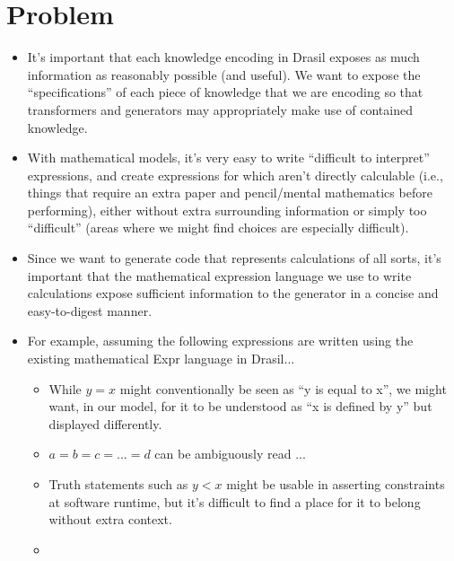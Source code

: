 
\section{Problem}

\begin{itemize}

	\item It's important that each knowledge encoding in Drasil exposes as much
	      information as reasonably possible (and useful).  We want to expose the ``specifications'' of each piece
	      of knowledge that we are encoding so that transformers and generators
	      may appropriately make use of contained knowledge.

	\item With mathematical models, it's very easy to write ``difficult to
	      interpret'' expressions, and create expressions for which aren't
	      directly calculable (i.e., things that require an extra paper and
	      pencil/mental mathematics before performing), either without
	      extra surrounding information or simply too ``difficult'' (areas
	      where we might find choices are especially difficult).

	\item Since we want to generate code that represents calculations of all
	      sorts, it's important that the mathematical expression language we
	      use to write calculations expose sufficient information to the
	      generator in a concise and easy-to-digest manner.

	\item For example, assuming the following expressions are written using
	      the existing mathematical Expr language in Drasil...
	      \begin{itemize}

		      \item While \(y = x\) might conventionally be seen as ``y is
		            equal to x'', we might want, in our model, for it to be
		            understood as ``x is defined by y'' but displayed differently.

		      \item \(a = b = c = ... = d\) can be ambiguously read ...

		      \item Truth statements such as \(y < x\) might be usable in
		            asserting constraints at software runtime, but it's
		            difficult to find a place for it to belong without extra
		            context.

		      \item {}

	      \end{itemize}

\end{itemize}

